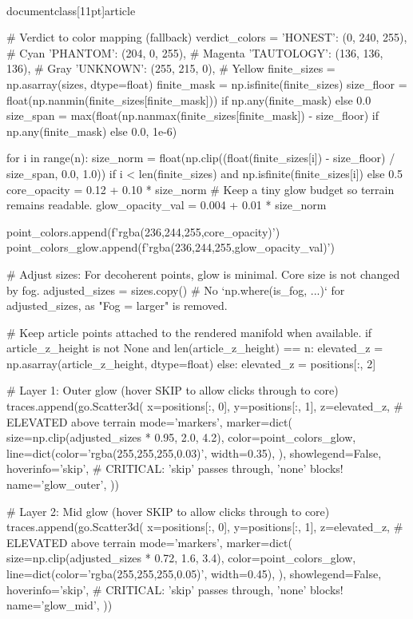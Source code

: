 \\documentclass[11pt]{article}
\begin{document}
\begin{CodeBlock}
{{{    # Verdict to color mapping (fallback)
    verdict_colors = {
        'HONEST': (0, 240, 255),       # Cyan
        'PHANTOM': (204, 0, 255),      # Magenta
        'TAUTOLOGY': (136, 136, 136),  # Gray
        'UNKNOWN': (255, 215, 0),      # Yellow
    }
    finite_sizes = np.asarray(sizes, dtype=float)
    finite_mask = np.isfinite(finite_sizes)
    size_floor = float(np.nanmin(finite_sizes[finite_mask])) if np.any(finite_mask) else 0.0
    size_span = max(float(np.nanmax(finite_sizes[finite_mask]) - size_floor) if np.any(finite_mask) else 0.0, 1e-6)

    for i in range(n):
        size_norm = float(np.clip((float(finite_sizes[i]) - size_floor) / size_span, 0.0, 1.0)) if i < len(finite_sizes) and np.isfinite(finite_sizes[i]) else 0.5
        core_opacity = 0.12 + 0.10 * size_norm
        # Keep a tiny glow budget so terrain remains readable.
        glow_opacity_val = 0.004 + 0.01 * size_norm

        point_colors.append(f'rgba(236,244,255,{core_opacity})')
        point_colors_glow.append(f'rgba(236,244,255,{glow_opacity_val})')

    # Adjust sizes: For decoherent points, glow is minimal. Core size is not changed by fog.
    adjusted_sizes = sizes.copy()
    # No `np.where(is_fog, ...)` for adjusted_sizes, as "Fog = larger" is removed.

    # Keep article points attached to the rendered manifold when available.
    if article_z_height is not None and len(article_z_height) == n:
        elevated_z = np.asarray(article_z_height, dtype=float)
    else:
        elevated_z = positions[:, 2]

    # Layer 1: Outer glow (hover SKIP to allow clicks through to core)
    traces.append(go.Scatter3d(
        x=positions[:, 0],
        y=positions[:, 1],
        z=elevated_z,  # ELEVATED above terrain
        mode='markers',
        marker=dict(
            size=np.clip(adjusted_sizes * 0.95, 2.0, 4.2),
            color=point_colors_glow,
            line=dict(color='rgba(255,255,255,0.03)', width=0.35),
        ),
        showlegend=False,
        hoverinfo='skip',  # CRITICAL: 'skip' passes through, 'none' blocks!
        name='glow_outer',
    ))

    # Layer 2: Mid glow (hover SKIP to allow clicks through to core)
    traces.append(go.Scatter3d(
        x=positions[:, 0],
        y=positions[:, 1],
        z=elevated_z,  # ELEVATED above terrain
        mode='markers',
        marker=dict(
            size=np.clip(adjusted_sizes * 0.72, 1.6, 3.4),
            color=point_colors_glow,
            line=dict(color='rgba(255,255,255,0.05)', width=0.45),
        ),
        showlegend=False,
        hoverinfo='skip',  # CRITICAL: 'skip' passes through, 'none' blocks!
        name='glow_mid',
    ))

}}}
\end{CodeBlock}
\end{document}
